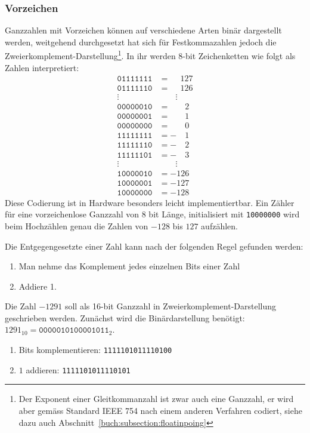 \subsubsection{Vorzeichen}
%
Ganzzahlen mit Vorzeichen können auf verschiedene Arten binär dargestellt
werden, weitgehend durchgesetzt hat sich für Festkommazahlen jedoch die
Zweierkomplement-Darstellung\footnote{Der Exponent einer Gleitkommanzahl
ist zwar auch eine Ganzzahl, er wird aber gemäss Standard IEEE 754
%
nach einem anderen Verfahren codiert, siehe dazu auch
Abschnitt~\ref{buch:subsection:floatinpoing}}.
%
In ihr werden 8-bit Zeichenketten wie folgt als Zahlen interpretiert:
\begin{align*}
\texttt{01111111}&= \phantom{-}127\\
\texttt{01111110}&= \phantom{-}126\\
\vdots\quad&\qquad\vdots\\
\texttt{00000010}&= \phantom{-00}2\\
\texttt{00000001}&= \phantom{-00}1\\
\texttt{00000000}&= \phantom{-00}0\\
\texttt{11111111}&= -\phantom{00}1\\
\texttt{11111110}&= -\phantom{00}2\\
\texttt{11111101}&= -\phantom{00}3\\
\vdots\quad&\qquad\vdots\\
\texttt{10000010}&=-126\\
\texttt{10000001}&=-127\\
\texttt{10000000}&=-128
\end{align*}
Diese Codierung ist in Hardware besonders leicht implementiertbar.
Ein Zähler für eine vorzeichenlose Ganzzahl von 8 bit Länge, initialisiert
mit \texttt{10000000} wird beim Hochzählen genau die Zahlen von $-128$
bis $127$ aufzählen.

Die Entgegengesetzte einer Zahl kann nach der folgenden Regel gefunden werden:
%
\begin{enumerate}
\item Man nehme das Komplement jedes einzelnen Bits einer Zahl
\item Addiere 1.
\end{enumerate}
\begin{beispiel}
Die Zahl $-1291$ soll als 16-bit Ganzzahl in Zweierkomplement-Darstellung
geschrieben werden.
Zunächst wird die Binärdarstellung benötigt:
$1291_{10}= \texttt{0000010100001011}_2$.
\begin{enumerate}
\item Bits komplementieren: \texttt{1111101011110100}
\item $1$ addieren: \texttt{1111101011110101}
\qedhere
\end{enumerate}
\end{beispiel}

